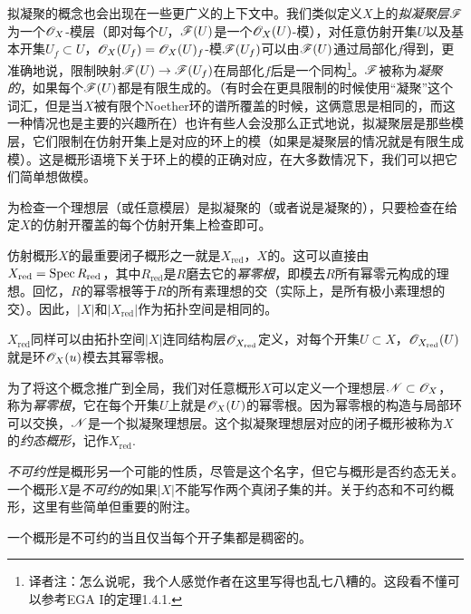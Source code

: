 拟凝聚的概念也会出现在一些更广义的上下文中。我们类似定义$X$上的\textit{拟凝聚层}$\mathscr{F}$为一个$\mathscr{O}_X$-模层（即对每个$U$，$\mathscr{F}(U)$是一个$\mathscr{O}_X(U)$-模），对任意仿射开集$U$以及基本开集$U_f\subset U$，$\mathscr{O}_X(U_f)=\mathscr{O}_X(U)_f$-模$\mathscr{F}(U_f)$可以由$\mathscr{F}(U)$通过局部化$f$得到，更准确地说，限制映射$\mathscr{F}(U)\to \mathscr{F}(U_f)$在局部化$f$后是一个同构\footnote{译者注：怎么说呢，我个人感觉作者在这里写得也乱七八糟的。这段看不懂可以参考EGA I的定理1.4.1. }。$\mathscr{F}$被称为\textit{凝聚的}，如果每个$\mathscr{F}(U)$都是有限生成的。（有时会在更具限制的时候使用“凝聚”这个词汇，但是当$X$被有限个Noether环的谱所覆盖的时候，这俩意思是相同的，而这一种情况也是主要的兴趣所在）也许有些人会没那么正式地说，拟凝聚层是那些模层，它们限制在仿射开集上是对应的环上的模（如果是凝聚层的情况就是有限生成模）。这是概形语境下关于环上的模的正确对应，在大多数情况下，我们可以把它们简单想做模。

\begin{exe}\label{exe:1.28}
为检查一个理想层（或任意模层）是拟凝聚的（或者说是凝聚的），只要检查在给定$X$的仿射开覆盖的每个仿射开集上检查即可。
\end{exe}

仿射概形$X$的最重要闭子概形之一就是$X_{\text{red}}$，$X$的。这可以直接由$X_{\text{red}}=\operatorname{Spec} R_{\text{red}}$，其中$R_\text{red}$是$R$磨去它的\textit{幂零根}，即模去$R$所有幂零元构成的理想。回忆，$R$的幂零根等于$R$的所有素理想的交（实际上，是所有极小素理想的交）。因此，$|X|$和$|X_\text{red}|$作为拓扑空间是相同的。

\begin{exe}\label{exe:1.29}
$X_\text{red}$同样可以由拓扑空间$|X|$连同结构层$\mathscr{O}_{X_\text{red}}$定义，对每个开集$U\subset X$，$\mathscr{O}_{X_\text{red}}(U)$就是环$\mathscr{O}_X(u)$模去其幂零根。
\end{exe}

为了将这个概念推广到全局，我们对任意概形$X$可以定义一个理想层$\mathscr{N}\subset \mathscr{O}_X$，称为\textit{幂零根}，它在每个开集$U$上就是$\mathscr{O}_X(U)$的幂零根。因为幂零根的构造与局部环可以交换，$\mathscr{N}$是一个拟凝聚理想层。这个拟凝聚理想层对应的闭子概形被称为$X$的\textit{约态概形}，记作$X_\text{red}$.

\textit{不可约性}是概形另一个可能的性质，尽管是这个名字，但它与概形是否约态无关。一个概形$X$是\textit{不可约的}如果$|X|$不能写作两个真闭子集的并。关于约态和不可约概形，这里有些简单但重要的附注。

\begin{exe}
	一个概形是不可约的当且仅当每个开子集都是稠密的。
\end{exe}


